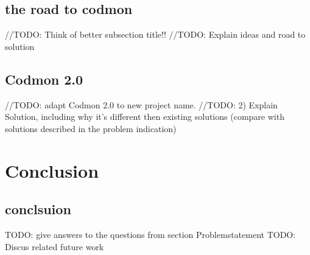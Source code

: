 \documentclass[a4paper,10pt]{scrartcl}
\begin{document}
\subsection{the road to codmon}
//TODO: Think of better subsection title!!
//TODO: Explain ideas and road to solution

\subsection{Codmon 2.0}
//TODO: adapt Codmon 2.0 to new project name.
//TODO: 2) Explain Solution, including why it's different then existing solutions (compare with solutions described in the problem indication)

\newpage
\section{Conclusion}
\subsection{conclsuion}
TODO: give answers to the questions from section Problemstatement
TODO: Discus related future work
\newpage


\end{document}
